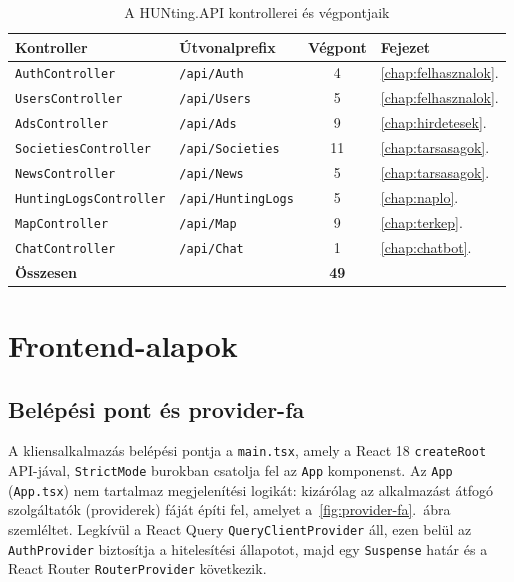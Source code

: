 \begin{table}[htbp]
	\centering
	\caption{A HUNting.API kontrollerei és végpontjaik}
	\label{tab:endpoint-osszes}
	\begin{tabular}{|l|l|c|l|}
		\hline
		\textbf{Kontroller} & \textbf{Útvonalprefix} & \textbf{Végpont} & \textbf{Fejezet} \\
		\hline
		\texttt{AuthController} & \texttt{/api/Auth} & 4 & \ref{chap:felhasznalok}. \\
		\hline
		\texttt{UsersController} & \texttt{/api/Users} & 5 & \ref{chap:felhasznalok}. \\
		\hline
		\texttt{AdsController} & \texttt{/api/Ads} & 9 & \ref{chap:hirdetesek}. \\
		\hline
		\texttt{SocietiesController} & \texttt{/api/Societies} & 11 & \ref{chap:tarsasagok}. \\
		\hline
		\texttt{NewsController} & \texttt{/api/News} & 5 & \ref{chap:tarsasagok}. \\
		\hline
		\texttt{HuntingLogsController} & \texttt{/api/HuntingLogs} & 5 & \ref{chap:naplo}. \\
		\hline
		\texttt{MapController} & \texttt{/api/Map} & 9 & \ref{chap:terkep}. \\
		\hline
		\texttt{ChatController} & \texttt{/api/Chat} & 1 & \ref{chap:chatbot}. \\
		\hline
		\multicolumn{2}{|l|}{\textbf{Összesen}} & \textbf{49} & \\
		\hline
	\end{tabular}
\end{table}

\section{Frontend-alapok}
\label{sec:alapok-frontend}

\subsection{Belépési pont és provider-fa}

A kliensalkalmazás belépési pontja a \texttt{main.tsx}, amely a React 18 \texttt{createRoot}
API-jával, \texttt{StrictMode} burokban csatolja fel az \texttt{App} komponenst. Az \texttt{App}
(\texttt{App.tsx}) nem tartalmaz megjelenítési logikát: kizárólag az alkalmazást átfogó
szolgáltatók (providerek) fáját építi fel, amelyet a~\ref{fig:provider-fa}.~ábra szemléltet.
Legkívül a React Query \texttt{QueryClientProvider} áll, ezen belül az \texttt{AuthProvider}
biztosítja a hitelesítési állapotot, majd egy \texttt{Suspense} határ és a React Router
\texttt{RouterProvider} következik.

